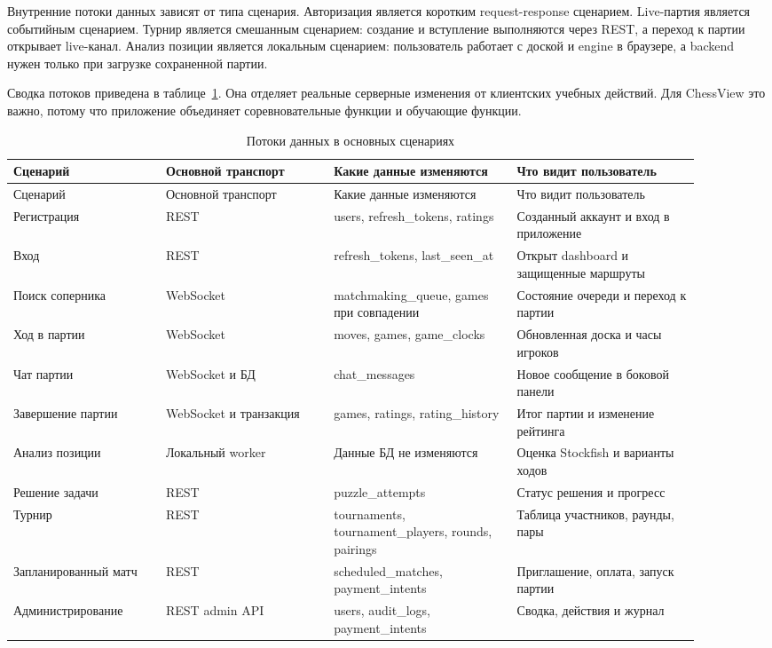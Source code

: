 Внутренние потоки данных зависят от типа сценария. Авторизация является коротким request-response сценарием. Live-партия является событийным сценарием. Турнир является смешанным сценарием: создание и вступление выполняются через REST, а переход к партии открывает live-канал. Анализ позиции является локальным сценарием: пользователь работает с доской и engine в браузере, а backend нужен только при загрузке сохраненной партии.

Сводка потоков приведена в таблице~\ref{tab:data-flows}. Она отделяет реальные серверные изменения от клиентских учебных действий. Для ChessView это важно, потому что приложение объединяет соревновательные функции и обучающие функции.

\noindent\scriptsize
\setlength{\tabcolsep}{3pt}
\renewcommand{\arraystretch}{1.16}
\begin{longtable}{|>{\RaggedRight\arraybackslash}p{0.20\linewidth}|>{\RaggedRight\arraybackslash}p{0.22\linewidth}|>{\RaggedRight\arraybackslash}p{0.24\linewidth}|>{\RaggedRight\arraybackslash}p{0.24\linewidth}|}
\caption{Потоки данных в основных сценариях}\label{tab:data-flows}\\
\hline
Сценарий & Основной транспорт & Какие данные изменяются & Что видит пользователь\\ \hline
\endfirsthead
\hline
Сценарий & Основной транспорт & Какие данные изменяются & Что видит пользователь\\ \hline
\endhead
Регистрация & REST & users, refresh_tokens, ratings & Созданный аккаунт и вход в приложение\\ \hline
Вход & REST & refresh_tokens, last_seen_at & Открыт dashboard и защищенные маршруты\\ \hline
Поиск соперника & WebSocket & matchmaking_queue, games при совпадении & Состояние очереди и переход к партии\\ \hline
Ход в партии & WebSocket & moves, games, game_clocks & Обновленная доска и часы игроков\\ \hline
Чат партии & WebSocket и БД & chat_messages & Новое сообщение в боковой панели\\ \hline
Завершение партии & WebSocket и транзакция & games, ratings, rating_history & Итог партии и изменение рейтинга\\ \hline
Анализ позиции & Локальный worker & Данные БД не изменяются & Оценка Stockfish и варианты ходов\\ \hline
Решение задачи & REST & puzzle_attempts & Статус решения и прогресс\\ \hline
Турнир & REST & tournaments, tournament_players, rounds, pairings & Таблица участников, раунды, пары\\ \hline
Запланированный матч & REST & scheduled_matches, payment_intents & Приглашение, оплата, запуск партии\\ \hline
Администрирование & REST admin API & users, audit_logs, payment_intents & Сводка, действия и журнал\\ \hline
\end{longtable}
\normalsize

